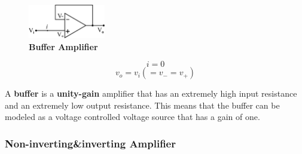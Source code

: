 \documentclass[a4 paper]{article}
\numberwithin{equation}{section}
\newcommand{\0}{\mathbf{0}}
\begin{document}
\begin{figure}[!ht]
  \centering
  \includegraphics[width=0.3\textwidth]{./images/buffer}
  \caption{{\bf Buffer Amplifier}}
\end{figure}

\begin{equation}
i = 0
\end{equation}
\begin{equation}
v_o = v_i(=v_-=v_+)
\end{equation}

A {\bf buffer} is a {\bf unity-gain} amplifier that has an extremely high input resistance and an extremely low output resistance. This means that the buffer can be modeled as a voltage controlled voltage source that has a gain of one.


\subsubsection{Non-inverting\&inverting Amplifier}
\end{document}
